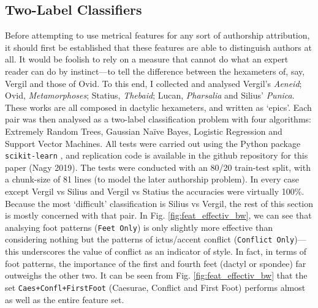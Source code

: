 \documentclass[11pt,a4paper]{scrartcl} %
\begin{document}
{\subsection{Two-Label Classifiers}

Before attempting to use metrical features for any sort of authorship attribution, it should first be established that these features are able to distinguish authors at all. It would be foolish to rely on a measure that cannot do what an expert reader can do by instinct---to tell the difference between the hexameters of, say, Vergil and those of Ovid. To this end, I collected and analysed Vergil's \textit{Aeneid}; Ovid, \textit{Metamorphoses}; Statius, \textit{Thebaid}; Lucan, \textit{Pharsalia} and Silius' \textit{Punica}. These works are all composed in dactylic hexameters, and written as `epics'. Each pair was then analysed as a two-label classification problem with four algorithms: Extremely Random Trees, Gaussian Naïve Bayes, Logistic Regression and Support Vector Machines. All tests were carried out using the Python package \texttt{scikit-learn} \cite{scikit-learn}, and replication code is available in the github repository for this paper (Nagy 2019). The tests were conducted with an 80/20 train-test split, with a chunk-size of 81 lines (to model the later authorship problem). In every case except Vergil vs Silius and Vergil vs Statius the accuracies were virtually 100\%. Because the most `difficult' classification is Silius vs Vergil, the rest of this section is mostly concerned with that pair. In Fig. \ref{fig:feat_effectiv_bw}, we can see that analsying foot patterns (\texttt{Feet Only}) is only slightly more effective than considering nothing but the patterns of ictus/accent conflict (\texttt{Conflict Only})---this underscores the value of conflict as an indicator of style. In fact, in terms of foot patterns, the importance of the first and fourth feet (dactyl or spondee) far outweighs the other two. It can be seen from Fig. \ref{fig:feat_effectiv_bw} that the set \texttt{Caes+Confl+FirstFoot} (Caesurae, Conflict and First Foot) performs almost as well as the entire feature set.

}
\end{document}
